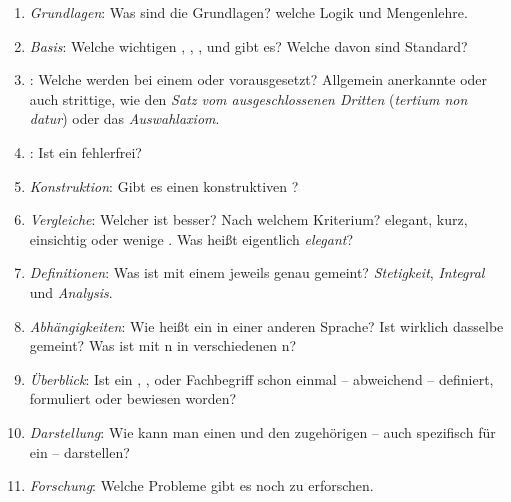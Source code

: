\begin{enumerate}
	
	\item \label{Frage:Grundlagen} \emph{Grundlagen}:
	Was sind die Grundlagen?
	\textZB welche Logik und Mengenlehre.
	
	\item \label{Frage:Basis} \emph{Basis}:
	Welche wichtigen , , ,  und  gibt es?
	Welche davon sind Standard?
	
	\item \label{Frage:Axiome} \emph{}:
	Welche  werden bei einem  oder  vorausgesetzt?
	Allgemein anerkannte oder auch strittige, wie \textzB den \emph{Satz vom ausgeschlossenen Dritten} (\emph{tertium non datur}) oder das \emph{Auswahlaxiom}.
	
	\item \label{Frage:Beweis} \emph{}:
	Ist ein  fehlerfrei?
	
	\item \label{Frage:Konstruktion} \emph{Konstruktion}:
	Gibt es einen konstruktiven ?
	
	\item \label{Frage:Vergleiche} \emph{Vergleiche}:
	Welcher  ist besser?
	Nach welchem Kriterium?
	\textZB elegant, kurz, einsichtig oder wenige .
	Was heißt eigentlich \emph{elegant}?
	
	\item \label{Frage:Definitionen} \emph{Definitionen}:
	Was ist mit einem  jeweils genau gemeint?
	\textZB \emph{Stetigkeit}, \emph{Integral} und \emph{Analysis}.
	
	\item \label{Frage:Abhängigkeiten} \emph{Abhängigkeiten}:
	Wie heißt ein  in einer anderen Sprache?
	Ist wirklich dasselbe gemeint?
	Was ist mit n in verschiedenen n?
	
	\item \label{Frage:Überblick} \emph{Überblick}:
	Ist ein , ,  oder Fachbegriff schon einmal -- \textggf abweichend -- definiert, formuliert oder bewiesen worden?
	
	\item \label{Frage:Darstellung} \emph{Darstellung}:
	Wie kann man einen  und den zugehörigen  -- \textggf auch spezifisch für ein  -- darstellen?
	
	\item \label{Frage:Forschung} \emph{Forschung}:
	Welche Probleme gibt es noch zu erforschen.
	
\end{enumerate}

